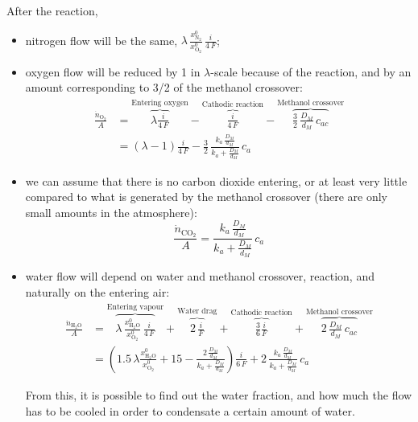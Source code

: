 \documentclass[a4paper,10pt]{article}
\newcommand{\HHO}{\ensuremath{\mathrm{H_2O}}}
\newcommand{\OO}{\ensuremath{\mathrm{O_2}}}
\newcommand{\NN}{\ensuremath{\mathrm{N_2}}}
\newcommand{\COO}{\ensuremath{\mathrm{CO_2}}}
\begin{document}
After the reaction,
\begin{itemize}
\item nitrogen flow will be the same, $\lambda \, \frac{x_\NN^0}{x_\OO^0}\,
\frac{i}{4\,F}$;
\item oxygen flow will be reduced by 1 in $\lambda$-scale because of the
reaction, and by an amount corresponding to 3/2 of the methanol
crossover:
\begin{equation}
\begin{aligned}
\frac{\dot n_\OO}{A} &= \overbrace{\lambda\frac{i}{4\,F}}^\text{Entering oxygen}
- \overbrace{\frac{i}{4\,F}}^\text{Cathodic reaction}
- \overbrace{ \frac{3}{2}\,\frac{D_M}{d_M}\,c_{ac}}^\text{Methanol crossover}\\
&= (\lambda - 1) \frac{i}{4\,F} - \frac{3}{2}\,\frac{k_a\,\frac{D_M}{d_M}}
{k_a+\frac{D_M}{d_M}}\,c_a
\end{aligned}
\end{equation}
\item we can assume that there is no carbon dioxide entering, or at least very
little compared to what is generated by the methanol crossover (there are only
small amounts in the atmosphere):
\begin{equation}
\frac{\dot n_\COO}{A} = \frac{k_a\,\frac{D_M}{d_M}} {k_a+\frac{D_M}{d_M}}\,c_a
\end{equation}
\item water flow will depend on water and methanol crossover, reaction, and
naturally on the entering air:
\begin{equation}
\begin{aligned}
\frac{\dot n_\HHO}{A} & = \overbrace{\lambda \, \frac{x_\HHO^0}{x_\OO^0} \,
\frac{i}{4\,F}}^\text{Entering vapour} +
\overbrace{2\,\frac{i}{F}}^\text{Water drag} +
\overbrace{\frac{3}{6}\frac{i}{F}}^\text{Cathodic reaction}
+ \overbrace{2\,\frac{D_M}{d_M}\,c_{ac}}^\text{Methanol crossover}\\
& = \left( 1.5\,\lambda \frac{x_\HHO^0}{x_\OO^0} + 15
- \frac{2\,\frac{D_M}{d_M}}{k_a+\frac{D_M}{d_M}} \right)\frac{i}{6\,F}
+ 2\,\frac{k_a\,\frac{D_M}{d_M}}{k_a+\frac{D_M}{d_M}}\, c_a
\end{aligned}
\end{equation}

From this, it is possible to find out the water fraction, and how much the
flow has to be cooled in order to condensate a certain amount of water.

\end{itemize}
\end{document}

